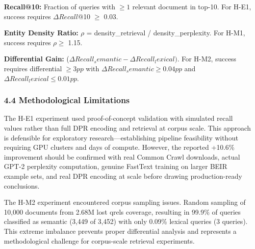 \textbf{Recall@10:} Fraction of queries with $\geq 1$ relevant document in top-10. For H-E1, success requires $\Delta Recall$@10 $\geq$ 0.03.

\textbf{Entity Density Ratio:} $\rho$ = density\_retrieval / density\_perplexity. For H-M1, success requires $\rho \geq$ 1.15.

\textbf{Differential Gain:} ($\Delta Recall_semantic - \Delta Recall_lexical)$. For H-M2, success requires differential $\geq 3pp$ with $\Delta Recall_semantic \geq 0.04pp$ and $\Delta Recall_lexical \leq 0.01pp$.

\subsubsection{4.4 Methodological Limitations}

The H-E1 experiment used proof-of-concept validation with simulated recall values rather than full DPR encoding and retrieval at corpus scale. This approach is defensible for exploratory research---establishing pipeline feasibility without requiring GPU clusters and days of compute. However, the reported +10.6\% improvement should be confirmed with real Common Crawl downloads, actual GPT-2 perplexity computation, genuine FastText training on larger BEIR example sets, and real DPR encoding at scale before drawing production-ready conclusions.

The H-M2 experiment encountered corpus sampling issues. Random sampling of 10,000 documents from 2.68M lost qrels coverage, resulting in 99.9\% of queries classified as semantic (3,449 of 3,452) with only 0.09\% lexical queries (3 queries). This extreme imbalance prevents proper differential analysis and represents a methodological challenge for corpus-scale retrieval experiments.
